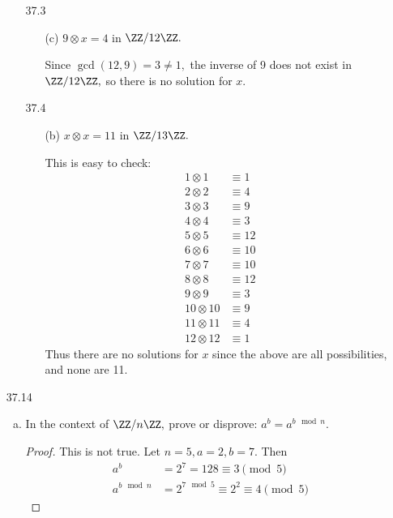 \documentclass{article}
\begin{document}
\begin{itemize}
\begin{itemize}
			\item[37.3]
				\begin{itemize}
					\item[(c)] $9\otimes x=4$ in $\ZZ/12\ZZ.$
						\begin{soln}
							Since $\gcd(12, 9)=3\neq 1,$ the inverse of 9 does not exist in $\ZZ/12\ZZ,$ so there is no solution for $x.$
						\end{soln}
						
				\end{itemize}

			\item[37.4]
				\begin{itemize}
					\item[(b)] $x\otimes x=11$ in $\ZZ/13\ZZ.$
						\begin{soln}
							This is easy to check:
							\begin{align*}
								1\otimes 1 &\equiv 1 \\
								2\otimes 2 &\equiv 4 \\
								3\otimes 3 &\equiv 9 \\
								4\otimes 4 &\equiv 3 \\
								5\otimes 5 &\equiv 12 \\
								6\otimes 6 &\equiv 10 \\
								7\otimes 7 &\equiv 10 \\
								8\otimes 8 &\equiv 12 \\
								9\otimes 9 &\equiv 3 \\
								10\otimes 10 &\equiv 9 \\
								11 \otimes 11 &\equiv 4 \\
								12\otimes 12 &\equiv 1
							\end{align*}
							Thus there are no solutions for $x$ since the above are all possibilities, and none are 11.
						\end{soln}
						
				\end{itemize}
				
		\end{itemize}

	\item[37.14]
		\begin{enumerate}[(a)]
			\item In the context of $\ZZ/n\ZZ,$ prove or disprove: $a^b=a^{b\mod n}.$
				\begin{proof}
					This is not true. Let $n=5, a=2, b=7.$ Then
					\begin{align*}
						a^b &= 2^7 = 128 \equiv 3\pmod 5 \\
						a^{b\mod n} &= 2^{7\mod 5} \equiv 2^2 \equiv 4\pmod 5
					\end{align*}
				\end{proof}


\end{enumerate}
\end{itemize}
\end{document}
